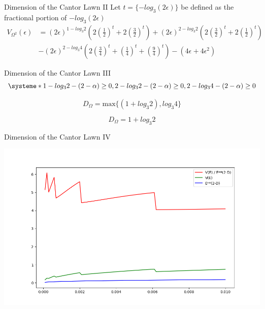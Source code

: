 \documentclass{if-beamer}
\newcommand{\Om}{\Omega}
\begin{document}
\begin{frame}{Dimension of the Cantor Lawn II}
	Let $\displaystyle t = \{-log_3 (2\epsilon)\}$ be defined as the fractional portion of $-log_3 (2\epsilon)$ 
	\begin{align*}
		\displaystyle
		V_{\Om^2}(\epsilon) &= (2\epsilon)^{1 - log_3 2} \left( 2\left(\frac{1}{2}\right)^t + 2\left(\frac{3}{2}\right)^t \right) + (2\epsilon)^{2- log_3 2} \left( 2\left(\frac{3}{2}\right)^t + 2\left(\frac{1}{2}\right)^t \right) \\
		& - (2\epsilon)^{2- log_3 4} \left( 2\left(\frac{3}{4}\right)^t + \left(\frac{1}{4}\right)^t + \left(\frac{9}{4}\right)^t \right) - (4\epsilon + 4\epsilon^2)
	\end{align*}
	\pause
	
\end{frame}

\begin{frame}{Dimension of the Cantor Lawn III}
\[ 
\displaystyle \systeme*{1 - log_3 2 - (2 - \alpha) \geq 0, 2 - log_3 2 - (2 - \alpha) \geq 0, 2 - log_3 4 - (2 - \alpha) \geq 0}
\]
\pause

\[ 
\displaystyle D_{\Om} = \text{max} \{ (1 + log_3 2), log_3 4 \}
\]
\pause

\[ 
\displaystyle D_{\Om} = 1 + log_3 2
\]
\end{frame}

\begin{frame}{Dimension of the Cantor Lawn IV}
	\begin{center}
		\includegraphics[scale=0.40]{CantorLawnVolumesPlot.png}
	\end{center}
\end{frame}
\end{document}
